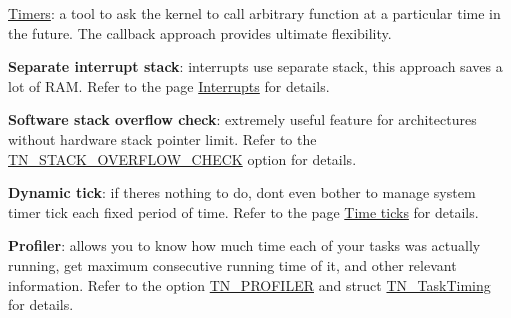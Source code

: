 \begin{DoxyItemize}
\item \hyperlink{tn__timer_8h}{Timers}\+: a tool to ask the kernel to call arbitrary function at a particular time in the future. The callback approach provides ultimate flexibility.
\item {\bfseries Separate interrupt stack}\+: interrupts use separate stack, this approach saves a lot of R\+AM. Refer to the page \hyperlink{interrupts}{Interrupts} for details.
\item {\bfseries Software stack overflow check}\+: extremely useful feature for architectures without hardware stack pointer limit. Refer to the {\ttfamily \hyperlink{tn__cfg__default_8h_ac6a9bbac3b3b25d9b5bc8c21d2e09955}{T\+N\+\_\+\+S\+T\+A\+C\+K\+\_\+\+O\+V\+E\+R\+F\+L\+O\+W\+\_\+\+C\+H\+E\+CK}} option for details.
\item {\bfseries Dynamic tick}\+: if there\textquotesingle{}s nothing to do, don\textquotesingle{}t even bother to manage system timer tick each fixed period of time. Refer to the page \hyperlink{time_ticks}{Time ticks} for details.
\item {\bfseries Profiler}\+: allows you to know how much time each of your tasks was actually running, get maximum consecutive running time of it, and other relevant information. Refer to the option {\ttfamily \hyperlink{tn__cfg__default_8h_a49a546b18cc1f75b51d4cf8b290634dd}{T\+N\+\_\+\+P\+R\+O\+F\+I\+L\+ER}} and {\ttfamily struct \hyperlink{structTN__TaskTiming}{T\+N\+\_\+\+Task\+Timing}} for details. 
\end{DoxyItemize}